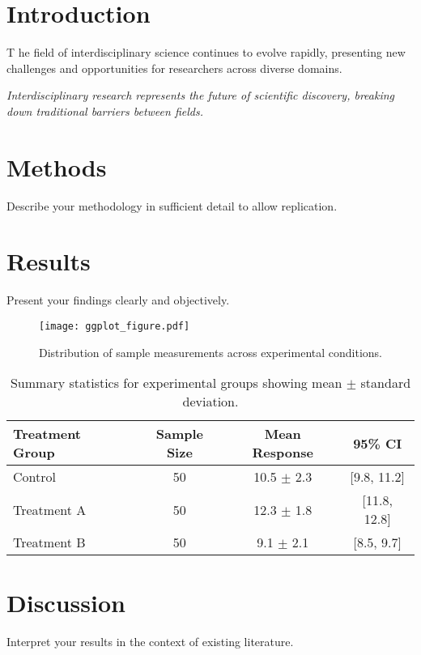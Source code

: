 \documentclass[12pt,twoside]{article}
\newcommand{\dropcap}[1]{%
    \lettrine[lines=3, lhang=0.1, loversize=0.05]{\color{cyanprimary}#1}{}%
}
\newcommand{\pullquote}[1]{%
    \begin{center}
    \begin{mdframed}[
        backgroundcolor=white,
        linecolor=cyanprimary,
        linewidth=3pt,
        leftline=true,
        rightline=false,
        topline=false,
        bottomline=false,
        leftmargin=2cm,
        rightmargin=2cm,
        innerleftmargin=15pt,
        innerrightmargin=15pt,
        innertopmargin=10pt,
        innerbottommargin=10pt
    ]
    \Large\textit{\color{cyansecondary}#1}
    \end{mdframed}
    \end{center}
}
\begin{document}
\section{Introduction}
\dropcap{T}he field of interdisciplinary science continues to evolve rapidly, presenting new challenges and opportunities for researchers across diverse domains.

\pullquote{Interdisciplinary research represents the future of scientific discovery, breaking down traditional barriers between fields.}

\section{Methods}
Describe your methodology in sufficient detail to allow replication.

\section{Results}
Present your findings clearly and objectively.

\begin{figure}[H]
    \centering
    \texttt{[image: ggplot\_figure.pdf]}
    \caption{Distribution of sample measurements across experimental conditions.}
    \label{fig:example}
\end{figure}

\begin{table}[H]
    \centering
    \caption{Summary statistics for experimental groups showing mean $\pm$ standard deviation.}
    \label{tab:example}
    \begin{tabular}{@{}lccc@{}}
    \toprule
    \textbf{Treatment Group} & \textbf{Sample Size} & \textbf{Mean Response} & \textbf{95\% CI} \\
    \midrule
    Control & 50 & 10.5 $\pm$ 2.3 & [9.8, 11.2] \\
    Treatment A & 50 & 12.3 $\pm$ 1.8 & [11.8, 12.8] \\
    Treatment B & 50 & 9.1 $\pm$ 2.1 & [8.5, 9.7] \\
    \bottomrule
    \end{tabular}
\end{table}

\section{Discussion}
Interpret your results in the context of existing literature.
\end{document}
